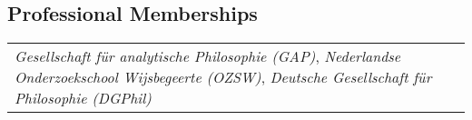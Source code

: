 \subsection*{Professional Memberships}
\begin{tabular}{p{\linewidth}}
  \emph{Gesellschaft f\"ur analytische Philosophie (GAP)}, \emph{Nederlandse Onderzoekschool Wijsbegeerte (OZSW)}, \emph{Deutsche Gesellschaft f\"ur Philosophie (DGPhil)}\\
\end{tabular}
